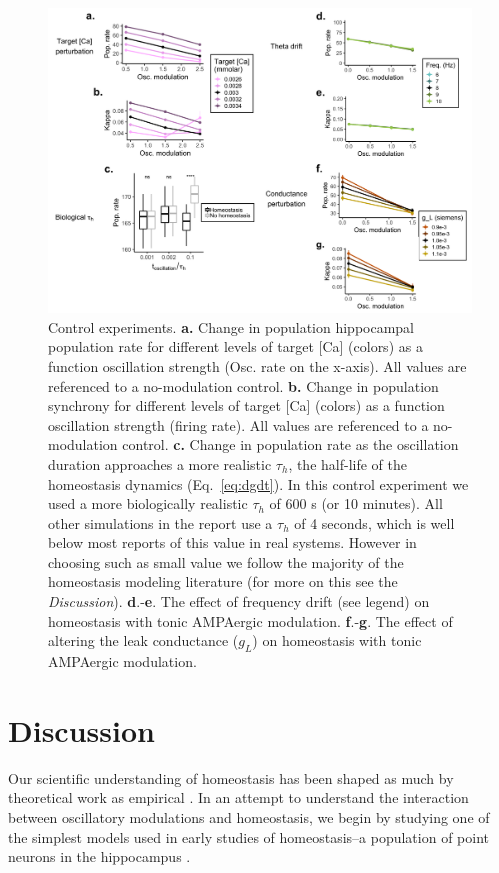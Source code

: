 \documentclass{article}
\begin{document}
\begin{figure}
\centering
\includegraphics[width=1\textwidth]{fig5.png}
\caption{\label{fig:f5}
    Control experiments.
    \textbf{a.} Change in population hippocampal population rate for different levels of target [Ca] (colors) as a function oscillation strength (Osc. rate on the x-axis). All values are referenced to a no-modulation control.
    \textbf{b.} Change in population synchrony for different levels of target [Ca] (colors) as a function oscillation strength (firing rate). All values are referenced to a no-modulation control.
    \textbf{c.} Change in population rate as the oscillation duration approaches a more realistic $\tau_h$, the half-life of the homeostasis dynamics (Eq.~\ref{eq:dgdt}). In this control experiment we used a more biologically realistic $\tau_h$ of 600 s (or 10 minutes). All other simulations in the report use a $\tau_h$ of 4 seconds, which is well below most reports of this value in real systems. However in choosing such as small value we follow the majority of the homeostasis modeling literature (for more on this see the \textit{Discussion}).
    \textbf{d}.-\textbf{e}. The effect of frequency drift (see legend) on homeostasis with tonic AMPAergic modulation.
    \textbf{f}.-\textbf{g}. The effect of altering the leak conductance ($g_L$) on homeostasis with tonic AMPAergic modulation.
}
\end{figure}


\section*{Discussion}
Our scientific understanding of homeostasis has been shaped as much by theoretical work as empirical \cite{Marder2014}. In an attempt to understand the interaction between oscillatory modulations and homeostasis, we begin by studying one of the simplest models used in early studies of homeostasis--a population of point neurons in the hippocampus \cite{LeMasson1993}.
\end{document}
